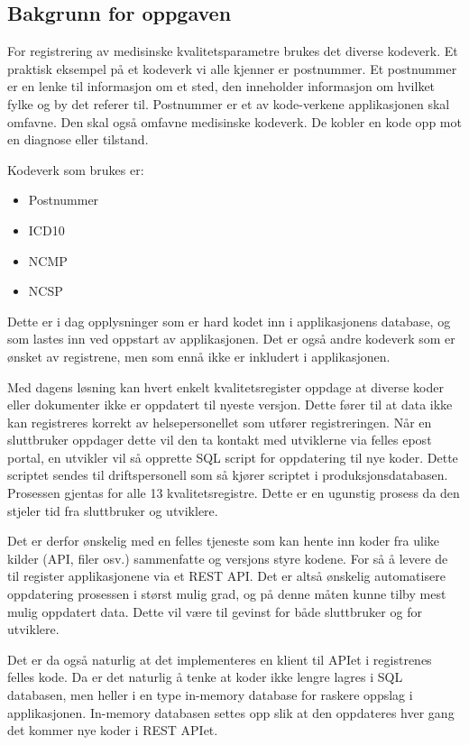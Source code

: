 \subsection{Bakgrunn for oppgaven} 

For registrering av medisinske kvalitetsparametre brukes det diverse kodeverk.
Et praktisk eksempel på et kodeverk vi alle kjenner er postnummer. Et postnummer er en lenke til informasjon om et sted, den inneholder informasjon om hvilket fylke og by det referer til.
Postnummer er et av kode-verkene applikasjonen skal omfavne. Den skal også omfavne medisinske kodeverk. De kobler en kode opp mot en diagnose eller tilstand.

Kodeverk som brukes er:
\begin{itemize}
   \item Postnummer
   \item ICD10 \cite{1-ICD-10}
   \item NCMP \cite{1-NCMP}
   \item NCSP \cite{1-NCSP}
\end{itemize}

Dette er i dag opplysninger som er hard kodet inn i applikasjonens database, og som lastes inn ved oppstart av applikasjonen.
Det er også andre kodeverk som er ønsket av registrene, men som ennå ikke er inkludert i applikasjonen.

Med dagens løsning kan hvert enkelt kvalitetsregister oppdage at diverse koder eller dokumenter ikke er oppdatert til nyeste versjon. Dette fører til
at data ikke kan registreres korrekt av helsepersonellet som utfører registreringen. Når en sluttbruker oppdager dette vil den ta kontakt med
utviklerne via felles epost portal, en utvikler vil så opprette SQL script for oppdatering til nye koder. Dette scriptet sendes til driftspersonell
som så kjører scriptet i produksjonsdatabasen. Prosessen gjentas for alle 13 kvalitetsregistre. Dette er en ugunstig prosess da den stjeler tid
fra sluttbruker og utviklere.

Det er derfor ønskelig med en felles tjeneste som kan hente inn koder fra ulike kilder (API, filer osv.) sammenfatte og versjons styre kodene. For
så å levere de til register applikasjonene via et REST API. Det er altså ønskelig automatisere oppdatering prosessen i størst mulig grad,
og på denne måten kunne tilby mest mulig oppdatert data. Dette vil være til gevinst for både sluttbruker og for utviklere.

Det er da også naturlig at det implementeres en klient til APIet i registrenes felles kode. Da er det naturlig å tenke at
koder ikke lengre lagres i SQL databasen, men heller i en type in-memory database for raskere oppslag i applikasjonen.
In-memory databasen settes opp slik at den oppdateres hver gang det kommer nye koder i REST APIet.

